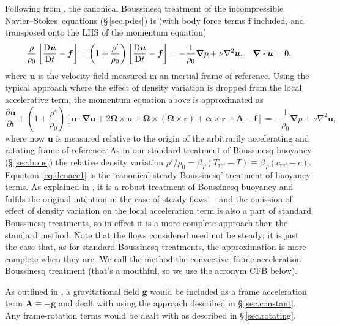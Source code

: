 \documentclass[11pt]{report}
\newcommand\NavSto{Navier--Stokes}
\begin{document}
Following from \citet{blss21}, the canonical Boussinesq treatment of
the incompressible \NavSto\ equations (\S\,\ref{sec.pdes}) is
(with body force terms $\bm{f}$ included, and transposed onto the LHS
of the momentum equation)
\begin{equation}
  \frac{\rho}{\rho_0}\left[\frac{\mathrm{D}\bm{u}}{\mathrm{D} t}-\bm{f}\right] = \left(1 +
  \frac{\rho'}{\rho_0}\right)\left[\frac{\mathrm{D}\bm{u}}{\mathrm{D} t}-\bm{f}\right]=
  -\frac{1}{\rho_0}\bm{\nabla}p+\nu\nabla^2\bm{u}, \quad \bm{\nabla\cdot u}=0,
\label{eq.full}
\end{equation}
where $\bm{u}$ is the velocity field measured in an inertial frame of
reference.  Using the typical approach where the effect of density
variation is dropped from the local accelerative term, the momentum
equation above is approximated as
\begin{equation}
  \frac{\partial\bm{u}}{\partial t} +
  \left(1+\frac{\rho'}{\rho_0}\right)\left[\bm{u\cdot\nabla u} +
   2\bm{\Omega}\!\times\!\bm{u} + \bm{\Omega}\!\times\!(\bm{\Omega}\!\times\!\bm{r}) +
  \bm{\alpha}\!\times\!\bm{r} + \bm{A} -\bm{f}\right]
  =   -\frac{1}{\rho_0}\bm{\nabla}p+\nu\nabla^2\bm{u},
\label{eq.denacc1}  
\end{equation}
where now $\bm{u}$ is measured relative to the origin of the
arbitrarily accelerating and rotating frame of reference.  As in our
standard treatment of Boussinesq buoyancy (\S\,\ref{sec.bous}) the
relative density variation
$\rho'/\rho_0=\beta_T(T_\text{ref}-T)\equiv\beta_T(c_\text{ref}-c)$.
Equation \eqref{eq.denacc1} is the `canonical steady Boussinesq'
treatment of buoyancy terms.  As explained in \citeauthor{blss21}, it
is a robust treatment of Boussinesq buoyancy and fulfils the original
intention in the case of steady flows\,---\,and the omission of effect
of density variation on the local acceleration term is also a part of
standard Boussinesq treatments, so in effect it is a more complete
approach than the standard method.  Note that the flows considered
need not be steady; it is just the case that, as for standard
Boussinesq treatments, the approximation is more complete when they
are.  We call the method the convective--frame-acceleration Boussinesq
treatment (that's a mouthful, so we use the acronym CFB below).

As outlined in \citeauthor{blss21}, a gravitational field $\bm{g}$
would be included as a frame acceleration term $\bm{A}\equiv-\bm{g}$
and dealt with using the approach described in \S\,\ref{sec.constant}.
Any frame-rotation terms would be dealt with as described in
\S\,\ref{sec.rotating}.
\end{document}
